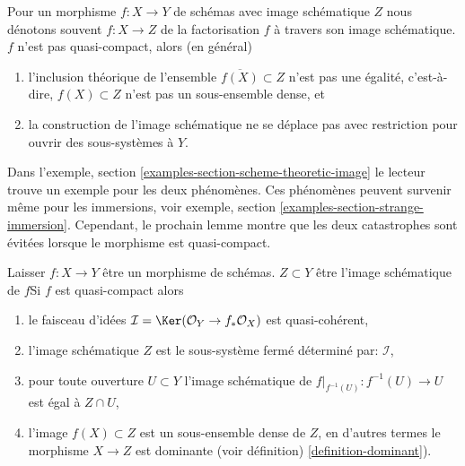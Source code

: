 \noindent

Pour un morphisme $f : X \to Y$ de schémas avec image schématique $Z$
nous dénotons souvent $f : X \to Z$ de la factorisation $f$
à travers son image schématique. $f$ n'est pas quasi-compact, alors (en général)

\begin{enumerate}

\item l'inclusion théorique de l'ensemble $\overline{f(X)} \subset Z$
n'est pas une égalité, c'est-à-dire, $f(X) \subset Z$ n'est pas un sous-ensemble dense, et
\item la construction de l'image schématique ne se déplace pas avec restriction pour ouvrir des sous-systèmes à $Y$.

\end{enumerate}

Dans l'exemple, section \ref{examples-section-scheme-theoretic-image}
le lecteur trouve un exemple pour les deux phénomènes. Ces phénomènes peuvent survenir même pour les immersions, voir exemple, section \ref{examples-section-strange-immersion}. Cependant, le prochain lemme montre que les deux catastrophes sont évitées lorsque le morphisme est quasi-compact.

\begin{lemma}

\label{lemma-quasi-compact-scheme-theoretic-image}

Laisser $f : X \to Y$ être un morphisme de schémas. $Z \subset Y$ être l'image schématique de $f$Si $f$ est quasi-compact alors

\begin{enumerate}

\item le faisceau d'idées
$\mathcal{I} = \Ker(\mathcal{O}_Y \to f_*\mathcal{O}_X)$
est quasi-cohérent,
\item l'image schématique $Z$ est le sous-système fermé déterminé par: $\mathcal{I}$,
\item pour toute ouverture $U \subset Y$ l'image schématique de
$f|_{f^{-1}(U)} : f^{-1}(U) \to U$ est égal à $Z \cap U$,
\item l'image $f(X) \subset Z$ est un sous-ensemble dense de $Z$, en d'autres termes le morphisme $X \to Z$ est dominante (voir définition) \ref{definition-dominant}).

\end{enumerate}

\end{lemma}

